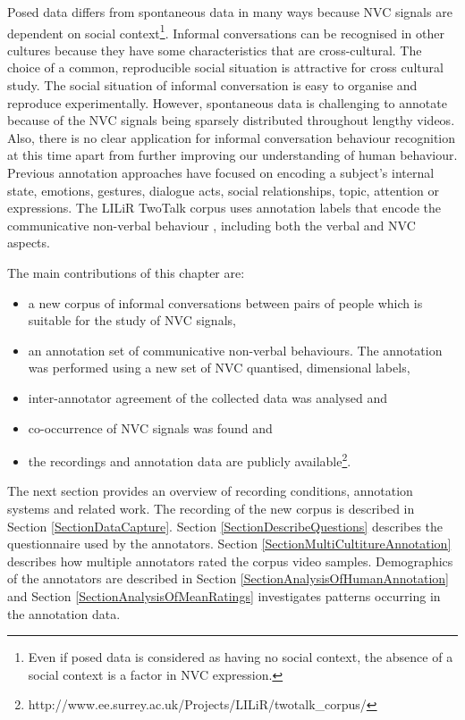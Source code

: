 Posed data differs from spontaneous data in many ways because \ac{NVC} signals are dependent on social context\footnote{Even if posed data is considered as having no social context, the absence of a social context is a factor in \ac{NVC} expression.}. Informal conversations can be recognised in other cultures because they have some characteristics that are cross-cultural. The choice of a common, reproducible social situation is attractive for cross cultural study. The social situation of informal conversation is easy to organise and reproduce experimentally. However, spontaneous data is challenging to annotate because of the \ac{NVC} signals being sparsely distributed throughout lengthy videos. Also, there is no clear application for informal conversation behaviour recognition at this time apart from further improving our understanding of human behaviour.
Previous annotation approaches have focused on encoding a subject's internal state, emotions, gestures, dialogue acts, social relationships, topic, attention or expressions. The LILiR TwoTalk corpus uses annotation labels that encode the communicative non-verbal behaviour \cite{Ekman1969}, including both the verbal and \ac{NVC} aspects. 

The main contributions of this chapter are:

\begin{itemize}
 \item a new corpus of informal conversations between pairs of people which is suitable for the study of \ac{NVC} signals,
 \item an annotation set of communicative non-verbal behaviours. The annotation was performed using a new set of \ac{NVC} quantised, dimensional labels,
 \item inter-annotator agreement of the collected data was analysed and 
 \item co-occurrence of \ac{NVC} signals was found and
 \item the recordings and annotation data are publicly
 available\footnote{\scriptsize{http://www.ee.surrey.ac.uk/Projects/LILiR/twotalk\_corpus/}}.
\end{itemize}

The next section provides an overview of recording conditions, annotation systems and related work. The recording of the new corpus is described in Section \ref{SectionDataCapture}. Section \ref{SectionDescribeQuestions} describes the questionnaire used by the annotators. Section \ref{SectionMultiCultitureAnnotation} describes how multiple annotators rated the corpus video samples. Demographics of the annotators are described in Section \ref{SectionAnalysisOfHumanAnnotation} and Section \ref{SectionAnalysisOfMeanRatings} investigates patterns occurring in the annotation data.


